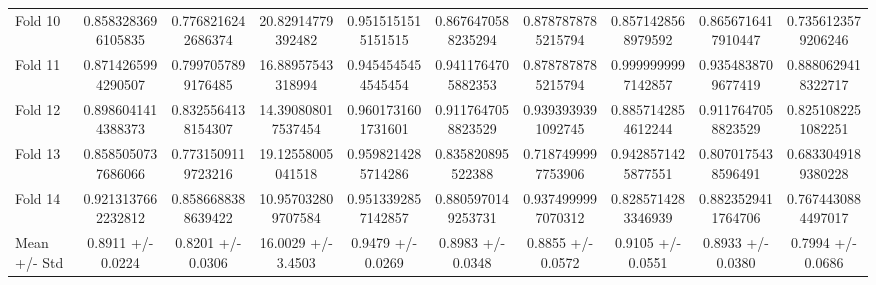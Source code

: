 \begin{table}[htbp]
\begin{tabular}{lccccccccc}
    Fold 10 & 0.8583283696105835 & 0.7768216242686374 & 20.82914779392482 & 0.9515151515151515 & 0.8676470588235294 & 0.8787878785215794 & 0.8571428568979592 & 0.8656716417910447 & 0.7356123579206246 \\
    Fold 11 & 0.8714265994290507 & 0.7997057899176485 & 16.88957543318994 & 0.9454545454545454 & 0.9411764705882353 & 0.8787878785215794 & 0.9999999997142857 & 0.9354838709677419 & 0.8880629418322717 \\
    Fold 12 & 0.8986041414388373 & 0.8325564138154307 & 14.390808017537454 & 0.9601731601731601 & 0.9117647058823529 & 0.9393939391092745 & 0.8857142854612244 & 0.9117647058823529 & 0.8251082251082251 \\
    Fold 13 & 0.8585050737686066 & 0.7731509119723216 & 19.12558005041518 & 0.9598214285714286 & 0.835820895522388 & 0.7187499997753906 & 0.9428571425877551 & 0.8070175438596491 & 0.6833049189380228 \\
    Fold 14 & 0.9213137662232812 & 0.8586688388639422 & 10.957032809707584 & 0.9513392857142857 & 0.8805970149253731 & 0.9374999997070312 & 0.8285714283346939 & 0.8823529411764706 & 0.7674430884497017 \\
    Mean +/- Std & 0.8911 +/- 0.0224 & 0.8201 +/- 0.0306 & 16.0029 +/- 3.4503 & 0.9479 +/- 0.0269 & 0.8983 +/- 0.0348 & 0.8855 +/- 0.0572 & 0.9105 +/- 0.0551 & 0.8933 +/- 0.0380 & 0.7994 +/- 0.0686 \\
    \bottomrule
  \end{tabular}
\end{table}